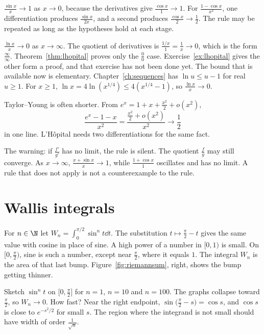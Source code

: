 \begin{examplex}
$\frac{\sin x}x\to1$ as $x\to0$, because the derivatives give $\frac{\cos x}1\to1$. For $\frac{1-\cos x}{x^2}$, one differentiation produces $\frac{\sin x}{2x}$, and a second produces $\frac{\cos x}2\to\frac12$. The rule may be repeated as long as the hypotheses hold at each stage.

$\frac{\ln x}x\to0$ as $x\to\infty$. The quotient of derivatives is $\frac{1/x}{1}=\frac1x\to0$, which is the form $\frac\infty\infty$. Theorem~\ref{thm:lhopital} proves only the $\frac00$ case. Exercise~\ref{ex:lhopital} gives the other form a proof, and that exercise has not been done yet. The bound that is available now is elementary. Chapter~\ref{ch:sequences} has $\ln u\le u-1$ for real $u\ge1$. For $x\ge1$, $\ln x=4\ln(x^{1/4})\le4(x^{1/4}-1)$, so $\frac{\ln x}x\to0$.

Taylor--Young is often shorter. From $e^x=1+x+\frac{x^2}2+o(x^2)$,
\[
\frac{e^x-1-x}{x^2}=\frac{\frac{x^2}2+o(x^2)}{x^2}\to\frac12
\]
in one line. L'H\^opital needs two differentiations for the same fact.

The warning: if $\frac{f'}{g'}$ has no limit, the rule is silent. The quotient $\frac fg$ may still converge. As $x\to\infty$, $\frac{x+\sin x}x\to1$, while $\frac{1+\cos x}1$ oscillates and has no limit. A rule that does not apply is not a counterexample to the rule.
\end{examplex}

\section{Wallis integrals}

For $n\in\N$ let $W_n=\displaystyle\int_0^{\pi/2}\sin^nt\dd t$. The substitution $t\mapsto\frac\pi2-t$ gives the same value with cosine in place of sine. A high power of a number in $[0,1)$ is small. On $\bigl[0,\frac\pi2\bigr)$, sine is such a number, except near $\frac\pi2$, where it equals $1$. The integral $W_n$ is the area of that last bump. Figure~\ref{fig:riemannsum}, right, shows the bump getting thinner.

\begin{think}
Sketch $\sin^nt$ on $\bigl[0,\frac\pi2\bigr]$ for $n=1$, $n=10$ and $n=100$. The graphs collapse toward $\frac\pi2$, so $W_n\to0$. How fast? Near the right endpoint, $\sin\bigl(\frac\pi2-s\bigr)=\cos s$, and $\cos s$ is close to $e^{-s^2/2}$ for small $s$. The region where the integrand is not small should have width of order $\frac1{\sqrt n}$.
\end{think}

